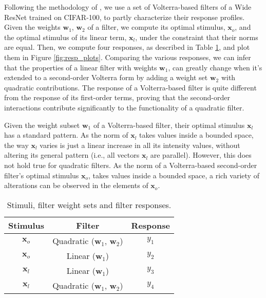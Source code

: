 \documentclass[10pt,twocolumn,letterpaper]{article}
\renewcommand{\vec}[1]{\mathbf{#1}}
\begin{document}
   Following the methodology of \cite{Analysis06}, we use a set of Volterra-based filters of a Wide ResNet trained on CIFAR-100, to partly characterize their response profiles. Given the weights $\vec{w}_{1}$, $\vec{w}_{2}$ of a filter, we compute its optimal stimulus, $\vec{x}_{o}$, and the optimal stimulus of its linear term, $\vec{x}_{l}$, under the constraint that their norms are equal. Then, we compute four responses, as described in Table \ref{tab:resp_prof}, and plot them in Figure \ref{fig:resp_plots}. Comparing the various responses, we can infer that the properties of a linear filter with weights $\vec{w}_{1}$, can greatly change when it's extended to a second-order Volterra form by adding a weight set $\vec{w}_{2}$ with quadratic contributions. The response of a Volterra-based filter is quite different from the response of its first-order terms, proving that the second-order interactions contribute significantly to the functionality of a quadratic filter.
   
   Given the weight subset $\vec{w}_{1}$ of a Volterra-based filter, their optimal stimulus $\vec{x}_{l}$ has a standard pattern. As the norm of $\vec{x}_{l}$ takes values inside a bounded space, the way $\vec{x}_{l}$ varies is just a linear increase in all its intensity values, without altering its general pattern (i.e., all vectors $\vec{x}_{l}$ are parallel). However, this does not hold true for quadratic filters. As the norm of a Volterra-based second-order filter's optimal stimulus $\vec{x}_{o}$, takes values inside a bounded space, a rich variety of alterations can be observed in the elements of $\vec{x}_{o}$.
   

\begin{table}[!ht]
\centering
\setlength{\tabcolsep}{.3em}
\begin{tabular}{|c|c|c|}
\hline
\textbf{Stimulus} & \textbf{Filter} & \textbf{Response} \\
\hline
$\vec{x}_o$ & Quadratic ($\vec{w}_1$, $\vec{w}_2$)  & $y_{1}$ \\ \hline
$\vec{x}_o$ & Linear    ($\vec{w}_1$) 			   & $y_{2}$ \\ \hline
$\vec{x}_l$ & Linear    ($\vec{w}_1$) 			   & $y_{3}$ \\ \hline
$\vec{x}_l$ & Quadratic ($\vec{w}_1$, $\vec{w}_2$)  & $y_{4}$ \\ \hline
\end{tabular}
\caption{Stimuli, filter weight sets and filter responses.}
\label{tab:resp_prof}
\end{table} 
\end{document}
